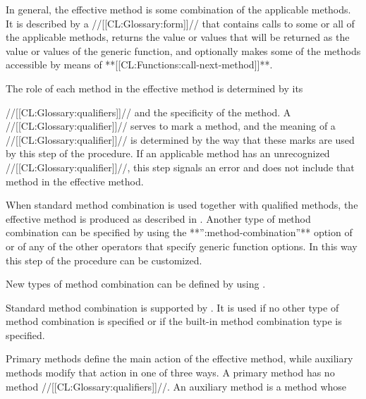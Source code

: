 In general, the effective method is some combination of the applicable methods.  It is described by a //[[CL:Glossary:form]]// that contains calls to some or all of the applicable methods, returns the value or values that will be returned as the value or values of the generic function, and optionally makes some of the methods accessible by means of  **[[CL:Functions:call-next-method]]**.

The role of each method in the effective method is determined by its

//[[CL:Glossary:qualifiers]]// and the specificity of the method.  A //[[CL:Glossary:qualifier]]// serves to mark a method, and the meaning of a //[[CL:Glossary:qualifier]]// is determined by the way that these marks are used by this step of the procedure.  If an applicable method has an unrecognized //[[CL:Glossary:qualifier]]//, this step signals an error and does not include that method in the effective method.

When standard method combination is used together with qualified methods,  the effective method is produced as described in \secref\StdMethComb.
                                                                   Another type of method combination can be specified by using the **'':method-combination''** option of  or of any of the other operators that specify generic function options.  In this way this step of the procedure can be customized.

New types of method combination can be defined by using  . 

\endsubsubsubsection%

\endsubsubsection%

  
                                                       

Standard method combination is supported by . It is used if no other type of method combination is specified or if the built-in method combination type  is specified. 

Primary methods define the main action of the effective method,   while auxiliary methods modify that action in one of three ways. A primary method has no method //[[CL:Glossary:qualifiers]]//.
                                                            An auxiliary method is a method whose 

